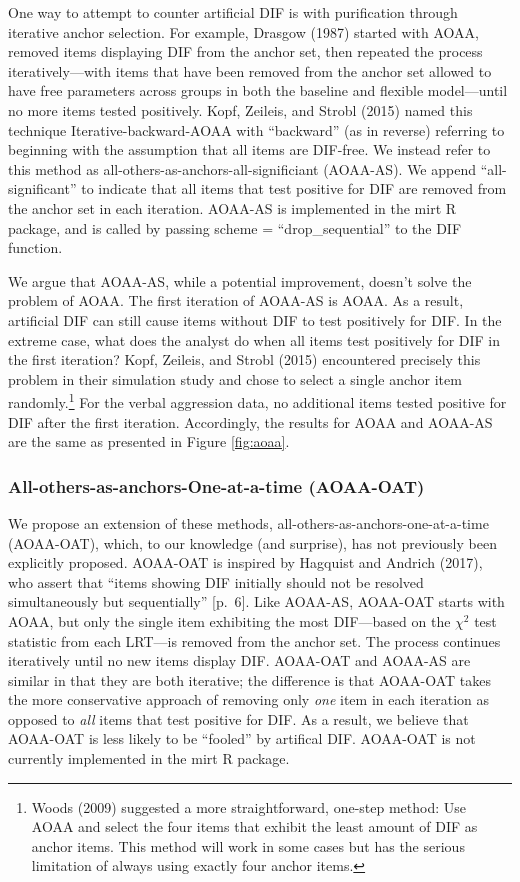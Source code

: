 \documentclass[
  english,
  man,floatsintext]{apa6}
\begin{document}
One way to attempt to counter artificial DIF is with purification through iterative anchor selection. For example, Drasgow (1987) started with AOAA, removed items displaying DIF from the anchor set, then repeated the process iteratively---with items that have been removed from the anchor set allowed to have free parameters across groups in both the baseline and flexible model---until no more items tested positively. Kopf, Zeileis, and Strobl (2015) named this technique Iterative-backward-AOAA with ``backward'' (as in reverse) referring to beginning with the assumption that all items are DIF-free. We instead refer to this method as all-others-as-anchors-all-significiant (AOAA-AS). We append ``all-significant'' to indicate that all items that test positive for DIF are removed from the anchor set in each iteration. AOAA-AS is implemented in the mirt R package, and is called by passing scheme = ``drop\_sequential'' to the DIF function.

We argue that AOAA-AS, while a potential improvement, doesn't solve the problem of AOAA. The first iteration of AOAA-AS is AOAA. As a result, artificial DIF can still cause items without DIF to test positively for DIF. In the extreme case, what does the analyst do when all items test positively for DIF in the first iteration? Kopf, Zeileis, and Strobl (2015) encountered precisely this problem in their simulation study and chose to select a single anchor item randomly.\footnote{Woods (2009) suggested a more straightforward, one-step method: Use AOAA and select the four items that exhibit the least amount of DIF as anchor items. This method will work in some cases but has the serious limitation of always using exactly four anchor items.} For the verbal aggression data, no additional items tested positive for DIF after the first iteration. Accordingly, the results for AOAA and AOAA-AS are the same as presented in Figure \ref{fig:aoaa}.

\hypertarget{all-others-as-anchors-one-at-a-time-aoaa-oat}{%
\subsubsection{All-others-as-anchors-One-at-a-time (AOAA-OAT)}\label{all-others-as-anchors-one-at-a-time-aoaa-oat}}

We propose an extension of these methods, all-others-as-anchors-one-at-a-time (AOAA-OAT), which, to our knowledge (and surprise), has not previously been explicitly proposed. AOAA-OAT is inspired by Hagquist and Andrich (2017), who assert that ``items showing DIF initially should not be resolved simultaneously but sequentially'' {[}p.~6{]}. Like AOAA-AS, AOAA-OAT starts with AOAA, but only the single item exhibiting the most DIF---based on the \(\chi^2\) test statistic from each LRT---is removed from the anchor set. The process continues iteratively until no new items display DIF. AOAA-OAT and AOAA-AS are similar in that they are both iterative; the difference is that AOAA-OAT takes the more conservative approach of removing only \emph{one} item in each iteration as opposed to \emph{all} items that test positive for DIF. As a result, we believe that AOAA-OAT is less likely to be ``fooled'' by artifical DIF. AOAA-OAT is not currently implemented in the mirt R package.
\end{document}
